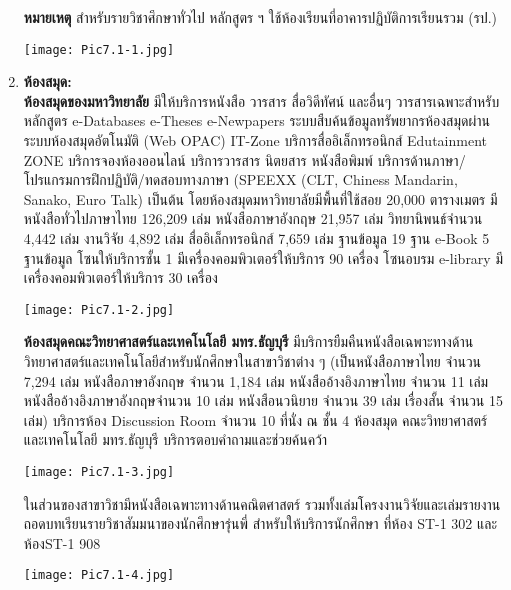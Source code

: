 \begin{enumerate}
\noindent
{\bf หมายเหตุ}	สำหรับรายวิชาศึกษาทั่วไป หลักสูตร ฯ ใช้ห้องเรียนที่อาคารปฏิบัติการเรียนรวม (รป.)
\begin{center}
\texttt{[image: Pic7.1-1.jpg]}
\end{center}
\item {\bf ห้องสมุด:}\\ {\bf ห้องสมุดของมหาวิทยาลัย} มีให้บริการหนังสือ วารสาร สื่อวิดีทัศน์ และอื่นๆ วารสารเฉพาะสำหรับหลักสูตร e-Databases e-Theses e-Newpapers ระบบสืบค้นข้อมูลทรัพยากรห้องสมุดผ่านระบบห้องสมุดอัตโนมัติ (Web OPAC) IT-Zone บริการสื่ออิเล็กทรอนิกส์ Edutainment ZONE บริการจองห้องออนไลน์ บริการวารสาร นิตยสาร หนังสือพิมพ์ บริการด้านภาษา/โปรแกรมการฝึกปฏิบัติ/ทดสอบทางภาษา (SPEEXX (CLT, Chiness Mandarin, Sanako, Euro Talk) เป็นต้น โดยห้องสมุดมหาวิทยาลัยมีพื้นที่ใช้สอย 20,000 ตารางเมตร มีหนังสือทั่วไปภาษาไทย 126,209 เล่ม หนังสือภาษาอังกฤษ 21,957 เล่ม วิทยานิพนธ์จำนวน 4,442 เล่ม งานวิจัย 4,892 เล่ม สื่ออิเล็กทรอนิกส์ 7,659 เล่ม  ฐานข้อมูล 19 ฐาน e-Book 5 ฐานข้อมูล โซนให้บริการชั้น 1 มีเครื่องคอมพิวเตอร์ให้บริการ 90 เครื่อง โซนอบรม e-library มีเครื่องคอมพิวเตอร์ให้บริการ 30 เครื่อง 
\begin{center}
\texttt{[image: Pic7.1-2.jpg]}\\
\end{center}
{\bf ห้องสมุดคณะวิทยาศาสตร์และเทคโนโลยี มทร.ธัญบุรี} มีบริการยืมคืนหนังสือเฉพาะทางด้านวิทยาศาสตร์และเทคโนโลยีสำหรับนักศึกษาในสาขาวิชาต่าง ๆ (เป็นหนังสือภาษาไทย จำนวน 7,294 เล่ม หนังสือภาษาอังกฤษ จำนวน 1,184 เล่ม หนังสืออ้างอิงภาษาไทย จำนวน 11 เล่ม หนังสืออ้างอิงภาษาอังกฤษจำนวน 10 เล่ม หนังสือนวนิยาย จำนวน 39 เล่ม เรื่องสั้น จำนวน 15 เล่ม) บริการห้อง Discussion Room จำนวน 10 ที่นั่ง ณ ชั้น 4 ห้องสมุด คณะวิทยาศาสตร์และเทคโนโลยี มทร.ธัญบุรี บริการตอบคำถามและช่วยค้นคว้า
\begin{center}
\texttt{[image: Pic7.1-3.jpg]}\\
\end{center}
ในส่วนของสาขาวิชามีหนังสือเฉพาะทางด้านคณิตศาสตร์  รวมทั้งเล่มโครงงานวิจัยและเล่มรายงานถอดบทเรียนรายวิชาสัมมนาของนักศึกษารุ่นพี่ สำหรับให้บริการนักศึกษา ที่ห้อง ST-1 302 และห้องST-1 908 
\begin{center}
\texttt{[image: Pic7.1-4.jpg]}\\
\end{center}
\end{enumerate}
\begin{doclist}
\end{doclist}

